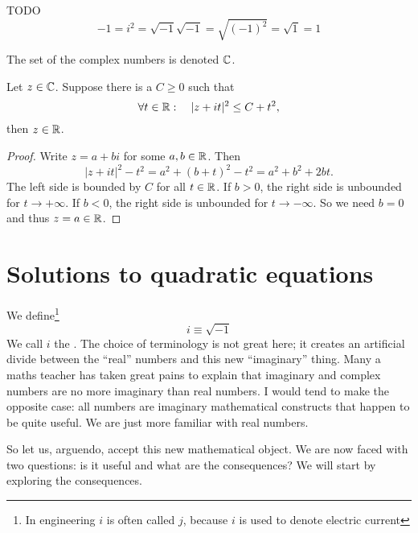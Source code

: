 TODO
\[ -1 = i^2 = \sqrt{-1}\sqrt{-1} = \sqrt{(-1)^2} = \sqrt{1} = 1 \]


The set of the complex numbers is denoted $\mathbb{C}$.

\begin{lemma} \label{boundedThenReal}
Let $z\in\mathbb{C}$. Suppose there is a $C\geq 0$ such that
\[ \forall t\in\mathbb{R}: \quad |z+it|^2\leq C+t^2, \]
then $z\in \mathbb{R}$.
\end{lemma}
\begin{proof}
Write $z = a+bi$ for some $a,b\in \mathbb{R}$. Then
\[ |z+it|^2-t^2 = a^2 + (b+t)^2 - t^2 = a^2+b^2+2bt. \]
The left side is bounded by $C$ for all $t\in\mathbb{R}$. If $b>0$, the right side is unbounded for $t\to +\infty$. If $b<0$, the right side is unbounded for $t\to -\infty$. So we need $b=0$ and thus $z=a\in\mathbb{R}$.
\end{proof}

\section{Solutions to quadratic equations}
 We define\footnote{In engineering $i$ is often called $j$, because $i$ is used to denote electric current}
\[ i \equiv \sqrt{-1} \]
We call $i$ the . The choice of terminology is not great here; it creates an artificial divide between the ``real'' numbers and this new ``imaginary'' thing. Many a maths teacher has taken great pains to explain that imaginary and complex numbers are no more imaginary than real numbers. I would tend to make the opposite case: all numbers are imaginary mathematical constructs that happen to be quite useful. We are just more familiar with real numbers.

So let us, arguendo, accept this new mathematical object. We are now faced with two questions: is it useful and what are the consequences? We will start by exploring the consequences.

